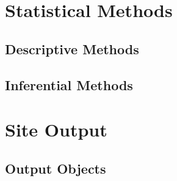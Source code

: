 \documentclass[
  letterpaper,
  DIV=11,
  numbers=noendperiod]{scrreprt}
\begin{document}
\hypertarget{statistical-methods}{%
\chapter{Statistical Methods}\label{statistical-methods}}

\hfill\break

\hypertarget{descriptive-methods}{%
\section{Descriptive Methods}\label{descriptive-methods}}

\hypertarget{inferential-methods}{%
\section{Inferential Methods}\label{inferential-methods}}

\hypertarget{site-output}{%
\chapter{Site Output}\label{site-output}}

\hfill\break

\hypertarget{output-objects}{%
\section{Output Objects}\label{output-objects}}
\end{document}
